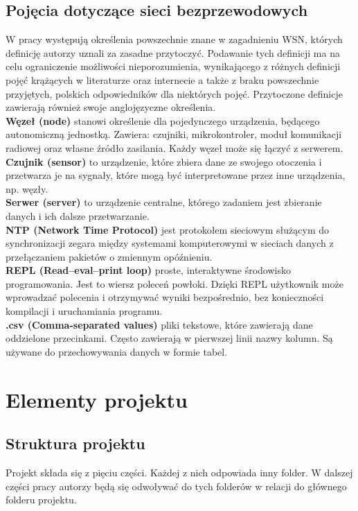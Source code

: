\documentclass[12pt,oneside,a4paper]{book}
\theoremstyle{break}
\begin{document}
\section{Pojęcia dotyczące sieci bezprzewodowych}
W pracy występują określenia powszechnie znane w zagadnieniu WSN, których
definicję autorzy uznali za zasadne przytoczyć. Podawanie tych definicji
ma na celu ograniczenie możliwości nieporozumienia, wynikającego z
różnych definicji pojęć krążących w literaturze oraz internecie a także
z braku powszechnie przyjętych, polskich odpowiedników dla niektórych
pojęć. Przytoczone definicje zawierają również swoje
anglojęzyczne określenia. \\
\textbf{Węzeł (node)} stanowi określenie dla pojedynczego
urządzenia, będącego autonomiczną jednostką. Zawiera: czujniki,
mikrokontroler, moduł komunikacji radiowej oraz własne źródło
zasilania. Każdy węzeł może się łączyć z serwerem.
\cite{wikipedia-wsn}\\
\textbf{Czujnik (sensor)} to urządzenie, które zbiera dane ze swojego
otoczenia i przetwarza je na sygnały, które mogą być interpretowane przez
inne urządzenia, np. węzły.
\cite{wikipedia-wsn}\\
\textbf{Serwer (server)} to urządzenie centralne, którego
zadaniem jest zbieranie danych i ich dalsze przetwarzanie.
\cite{wikipedia-wsn}\\
\textbf{NTP (Network Time Protocol)} jest protokołem sieciowym
służącym do synchronizacji zegara między systemami komputerowymi
w sieciach danych z przełączaniem pakietów o zmiennym opóźnieniu.
\cite{wikipedia-ntp}\\
\textbf{REPL (Read–eval–print loop)} proste, interaktywne środowisko programowania.
Jest to wiersz poleceń powłoki. Dzięki REPL użytkownik może wprowadzać
polecenia i otrzymywać wyniki bezpośrednio, bez konieczności
kompilacji i uruchamiania programu. 
\cite{wikipedia-repl}\\
\textbf{.csv (Comma-separated values)} pliki tekstowe, które
zawierają dane oddzielone przecinkami. Często zawierają w pierwszej
linii nazwy kolumn. Są używane do przechowywania danych w formie tabel.
\cite{wikipedia-csv}\\

\chapter{Elementy projektu}

\section{Struktura projektu}
Projekt składa się z pięciu części. Każdej z nich odpowiada inny folder. W dalszej części 
pracy autorzy będą się odwoływać do tych folderów w relacji do głównego folderu projektu.
\end{document}
